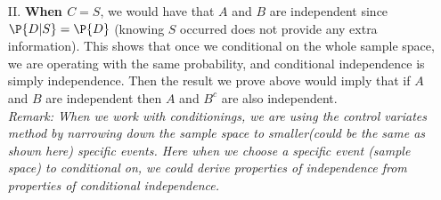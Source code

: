 \begin{exercise}
\begin{solution}
\begin{itemize}
			\item[II.] \textbf{When $C=S$}, we would have that $A$ and $B$ are independent since $\P{D|S}=\P{D}$ (knowing $S$ occurred does not provide any extra information). This shows that once we conditional on the whole sample space, we are operating with the same probability, and conditional independence is simply independence. Then the result we prove above would imply that if $A$ and $B$ are independent then $A$ and $B^c$ are also independent.\\ \textit{\scriptsize Remark: When we work with conditionings, we are using the control variates method by narrowing down the sample space to smaller(could be the same as shown here) specific events. Here when we choose a  specific event (sample space) to conditional on, we could derive properties of independence from properties of conditional independence.}  
		\end{itemize}
	\end{solution}	
\end{exercise}


